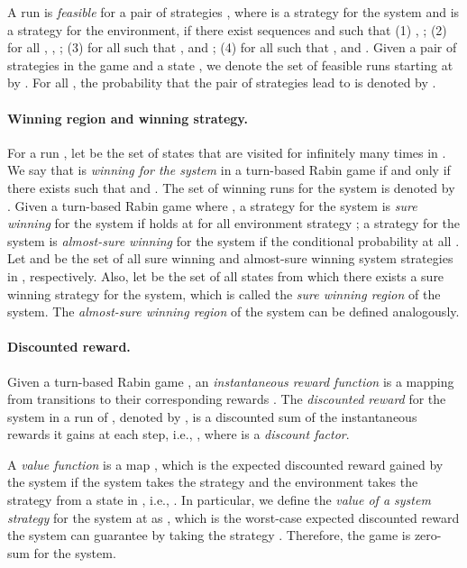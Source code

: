 \documentclass[runningheads,a4paper]{llncs}
\begin{document}
A run  is \emph{feasible} for a pair of strategies , where  is a strategy for the system and  is a strategy for the environment, if there exist sequences  and  such that (1) , ; (2) for all , , ; (3) for all  such that ,  and ; (4) for all  such that ,  and . Given a pair of strategies  in the game  and a state , we denote the set of feasible runs starting at  by . For all , the probability that the pair of strategies lead to  is denoted by . 



\paragraph{Winning region and winning strategy.} For a run , let  be the set of states that are visited for infinitely many times in . We say that  is \emph{winning for the system} in a turn-based Rabin game  if and only if there exists  such that  and . The set of winning runs for the system is denoted by . 
Given a turn-based Rabin game  where , a strategy  for the system is \emph{sure winning} for the system if  holds at  for all environment strategy ; a strategy  for the system is \emph{almost-sure winning} for the system if the conditional probability  at all . Let  and  be the set of all sure winning and almost-sure winning system strategies in , respectively. Also, let  be the set of all states from which there exists a sure winning strategy for the system, which is called the \emph{sure winning region} of the system. The \emph{almost-sure winning region}  of the system can be defined analogously.

\paragraph{Discounted reward.} Given a turn-based Rabin game , an \emph{instantaneous reward function} is a mapping from transitions to their corresponding rewards . 
The \emph{discounted reward} for the system in a run  of , denoted by , is a discounted sum of the instantaneous rewards it gains at each step, i.e., , where  is a \emph{discount factor}. 


A \emph{value function} is a map , which is the expected discounted reward gained by the system if the system takes the strategy  and the environment takes the strategy  from a state  in , i.e., . In particular, we define the \emph{value of a system strategy } for the system at  as , which is the worst-case expected discounted reward the system can guarantee by taking the strategy . Therefore, the game is zero-sum for the system. 
\end{document}
